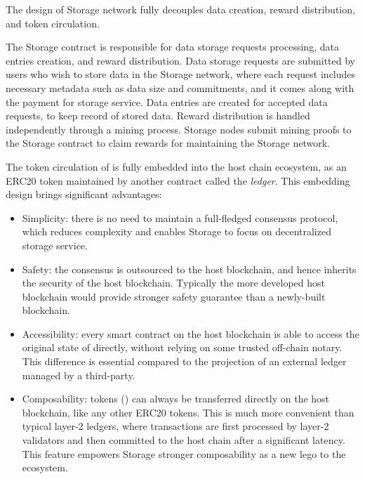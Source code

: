 The design of \projabbrev Storage network fully decouples data creation, reward distribution, and token circulation.

The \projabbrev Storage contract is responsible for data storage requests processing, data entries creation, and reward distribution. 
Data storage requests are submitted by users who wish to store data in the \projabbrev Storage network,
where each request includes necessary metadata such as data size and commitments,
and it comes along with the payment for storage service.
Data entries are created for accepted data requests, to keep record of stored data.
Reward distribution is handled independently through a mining process.
Storage nodes submit mining proofs to the \projabbrev Storage contract to claim rewards for maintaining the \projabbrev Storage network.


The token circulation of \projabbrev is fully embedded into the host chain ecosystem,
as an ERC20 token maintained by another contract called the \emph{\token ledger}.
% 
This embedding design brings significant advantages:
\begin{itemize}
	\item Simplicity: there is no need to maintain a full-fledged  consensus protocol,
	which reduces complexity and enables \projabbrev Storage to focus on decentralized storage service.

	\item Safety: the consensus is outsourced to the host blockchain, and hence inherits the security of the host blockchain. 
	Typically the more developed host blockchain would provide stronger safety guarantee than a newly-built blockchain.

	\item Accessibility: every smart contract on the host blockchain is able to access the original state of \project directly, without relying on some trusted off-chain notary. This difference is essential compared to the projection of an external ledger managed by a third-party.

	\item Composability: \projabbrev tokens (\token) can always be transferred directly on the host blockchain, like any other ERC20 tokens. 
	This is much more convenient than typical layer-2 ledgers, where transactions are first processed by layer-2 validators and then committed to the host chain after a significant latency.
	This feature empowers \projabbrev Storage stronger composability as a new lego to the ecosystem.
\end{itemize}



